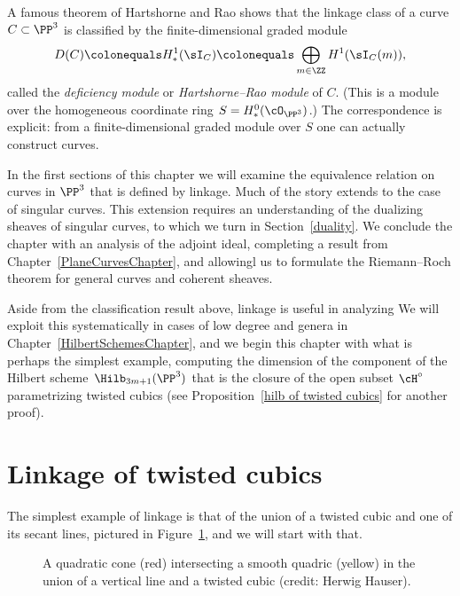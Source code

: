 A famous theorem of Hartshorne and Rao \cite{MR520926} shows that the
linkage class of a curve $C\subset \PP^3$
is classified by the finite-dimensional graded module
$$
D(C) \colonequals H^1_*(\sI_C)\colonequals \bigoplus_{m\in \ZZ}
H^1(\sI_C(m)),
$$
called the
\emph{deficiency module} or \emph{Hartshorne--Rao module}
%
%
of $C$. (This is a module over the
homogeneous coordinate ring $S = H^0_*(\cO_{\PP^3})$.) The correspondence
is explicit: from a finite-dimensional graded module over $S$ one can
actually construct curves.

In the first sections of this chapter we will examine the equivalence
relation on curves in $\PP^3$ that is defined by linkage. Much of the
story extends to the case of singular curves. This extension requires
an understanding of the dualizing sheaves of singular curves, to which
we turn in
%
Section~\ref{duality}. We conclude the chapter with an analysis of the
adjoint ideal, completing a result from
\null Chapter~\ref{PlaneCurvesChapter},
and allowingl us to formulate
the Riemann--Roch theorem for general curves and coherent sheaves.

Aside from the classification result above, linkage is useful in analyzing
We will exploit this systematically in cases of low
degree and genera in Chapter~\ref{HilbertSchemesChapter}, and we begin
this chapter with what is perhaps the simplest example, computing the
dimension of the component of
%
the Hilbert scheme $\Hilb_{3m+1}(\PP^3)$ that is the closure of
the open subset $\cH^\circ$  parametrizing twisted cubics (see
Proposition~\ref{hilb of twisted cubics} for another proof).

\section{Linkage of twisted cubics}
The simplest example of linkage is that of the union of a
%
twisted cubic and one of its secant lines, pictured in
Figure~\ref{cubicAndLine}, and we will start with that.

\begin{figure}
\fboxsep=0pt
\caption{A quadratic cone (red) intersecting a smooth quadric (yellow) in
the union of a vertical line and a twisted cubic (credit: Herwig Hauser).}
\label{cubicAndLine}
\end{figure}

